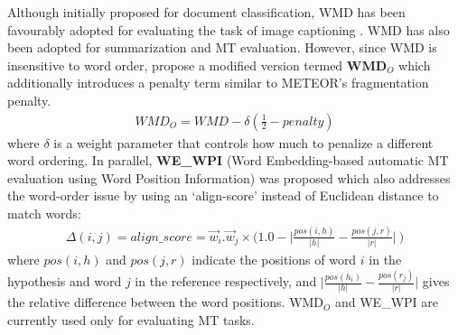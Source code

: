 Although initially proposed for document classification, WMD has been favourably adopted for evaluating the task of image captioning . 
WMD has also been adopted for summarization and MT evaluation. However, since WMD is insensitive to word order,   propose a modified version termed \textbf{WMD}$_O$ which additionally introduces a penalty term similar to METEOR's fragmentation penalty.  
\begin{align*}
    WMD_O = WMD - \delta (\frac{1}{2} - penalty)
\end{align*}
where $\delta$ is a weight parameter that controls how much to penalize a different word ordering. In parallel, \textbf{WE\_WPI} (Word Embedding-based automatic MT evaluation using Word Position Information)  was proposed which also addresses the word-order issue by using an `align-score' instead of Euclidean distance to match words: 
\begin{align*}
    \Delta(i,j) = align\_score = \overrightarrow{w}_i.\overrightarrow{w}_j \times \Bigg(1.0 - \Big|\frac{pos(i,h)}{|h|} - \frac{pos(j,r)}{|r|}\Big|\ \Bigg)
\end{align*}
where $pos(i,h)$ and $pos(j,r)$ indicate the positions of word $i$ in the hypothesis and word $j$ in the reference respectively, and $\Big|\frac{pos(h_i)}{|h|} - \frac{pos(r_j)}{|r|}\Big|$ gives the relative difference between the word positions. WMD$_O$ and WE\_WPI are currently used only for evaluating MT tasks.\\ 
\\
